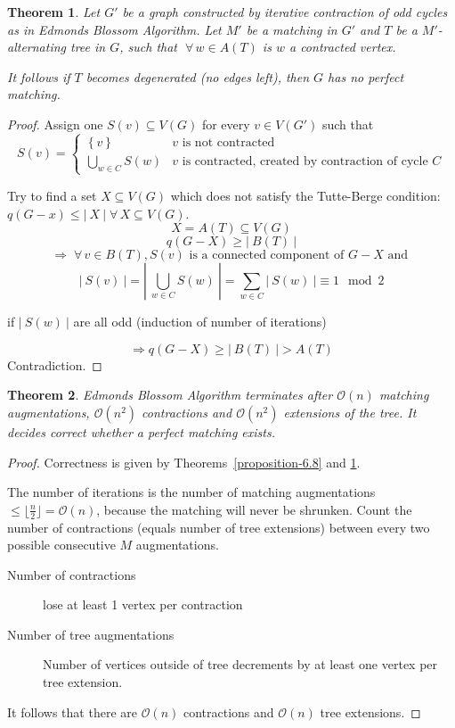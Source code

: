 \documentclass{article}
\newtheorem{theorem}{Theorem}
\newcommand{\card}[1]{\left|\:\!#1\:\!\right|}
\newcommand{\set}[1]{\left\{#1\right\}}
\newcommand{\fall}{\;\forall\,}
\begin{document}
\begin{theorem}\label{proposition-6.9}
  Let $G'$ be a graph constructed by iterative contraction of odd cycles as in Edmonds Blossom Algorithm. Let $M'$ be a matching in $G'$ and $T$ be a $M'$-alternating tree in $G$, such that $\fall w \in A(T)$ is $w$ a contracted vertex.

  It follows if $T$ becomes degenerated (no edges left), then $G$ has no perfect matching.
\end{theorem}

\begin{proof}
  Assign one $S(v) \subseteq V(G)$ for every $v \in V(G')$ such that
  \[
    S(v) = \begin{cases}
      \set{v}                 & v \text{ is not contracted} \\
      \bigcup_{w \in C} S(w)  & v \text{ is contracted, created by contraction of cycle $C$}
    \end{cases}
  \]

  Try to find a set $X \subseteq V(G)$ which does not satisfy the Tutte-Berge condition:
  $q (G-x) \leq \card{X} \fall X \subseteq V(G)$.
  \[
    X = A(T) \subseteq V(G)
  \] \[
    q(G-X) \geq \card{B(T)}
  \] \[
    \Rightarrow
      \fall v \in B(T),
        S(v) \text{ is a connected component of $G-X$ and
        }
  \] \[
    \card{S(v)} = \card{\bigcup_{w \in C} S(w)}
        = \sum_{w \in C} \card{S(w)}
        \equiv 1 \mod{2}
  \]
  \begin{center}
    if $\card{S(w)}$ are all odd (induction of number of iterations)
  \end{center}
  \[
    \Rightarrow q(G-X) \geq \card{B(T)} > A(T)
  \]
  Contradiction.
\end{proof}

\begin{theorem}\label{satz-6.10}
  Edmonds Blossom Algorithm terminates after $\mathcal{O}(n)$ matching augmentations,
  $\mathcal{O}(n^2)$ contractions and $\mathcal{O}(n^2)$ extensions of the tree.
  It decides correct whether a perfect matching exists.
\end{theorem}

\begin{proof}
  Correctness is given by Theorems~\ref{proposition-6.8} and \ref{proposition-6.9}.

  The number of iterations is the number of matching augmentations $\leq \lfloor \frac{n}2 \rfloor = \mathcal{O}(n)$, because the matching will never be shrunken.
  Count the number of contractions (equals number of tree extensions) between every two possible consecutive $M$ augmentations.

  \begin{description}
    \item[Number of contractions] lose at least 1 vertex per contraction
    \item[Number of tree augmentations]
      Number of vertices outside of tree decrements by at least one vertex per tree extension.
  \end{description}

  It follows that there are $\mathcal{O}(n)$ contractions and $\mathcal{O}(n)$ tree extensions.
\end{proof}
\end{document}
